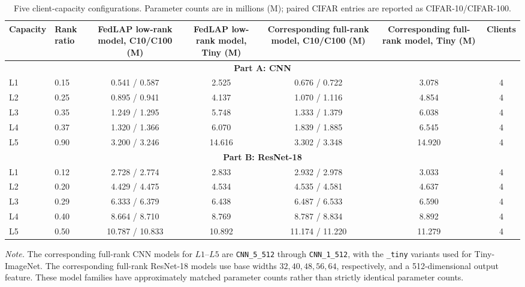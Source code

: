 \begin{table}[t]
\centering
\caption{Five client-capacity configurations.  Parameter counts are in
millions (M); paired CIFAR entries are reported as CIFAR-10/CIFAR-100.}
\label{tab:appendix_capacity_configurations}
\scriptsize
\setlength{\tabcolsep}{5pt}
\renewcommand{\arraystretch}{1.12}
\begin{tabularx}{\textwidth}{@{}llccccc@{}}
\toprule
\textbf{Capacity} & \textbf{Rank ratio} &
\textbf{FedLAP low-rank model, C10/C100 (M)} &
\textbf{FedLAP low-rank model, Tiny (M)} &
\textbf{Corresponding full-rank model, C10/C100 (M)} &
\textbf{Corresponding full-rank model, Tiny (M)} &
\textbf{Clients} \\
\midrule
\multicolumn{7}{c}{\textbf{Part A: CNN}} \\
\midrule
L1 & 0.15 & 0.541 / 0.587 & 2.525 & 0.676 / 0.722 & 3.078 & 4 \\
L2 & 0.25 & 0.895 / 0.941 & 4.137 & 1.070 / 1.116 & 4.854 & 4 \\
L3 & 0.35 & 1.249 / 1.295 & 5.748 & 1.333 / 1.379 & 6.038 & 4 \\
L4 & 0.37 & 1.320 / 1.366 & 6.070 & 1.839 / 1.885 & 6.545 & 4 \\
L5 & 0.90 & 3.200 / 3.246 & 14.616 & 3.302 / 3.348 & 14.920 & 4 \\
\midrule
\multicolumn{7}{c}{\textbf{Part B: ResNet-18}} \\
\midrule
L1 & 0.12 & 2.728 / 2.774 & 2.833 & 2.932 / 2.978 & 3.033 & 4 \\
L2 & 0.20 & 4.429 / 4.475 & 4.534 & 4.535 / 4.581 & 4.637 & 4 \\
L3 & 0.29 & 6.333 / 6.379 & 6.438 & 6.487 / 6.533 & 6.590 & 4 \\
L4 & 0.40 & 8.664 / 8.710 & 8.769 & 8.787 / 8.834 & 8.892 & 4 \\
L5 & 0.50 & 10.787 / 10.833 & 10.892 & 11.174 / 11.220 & 11.279 & 4 \\
\bottomrule
\end{tabularx}
\begin{minipage}{\textwidth}
\footnotesize
\textit{Note.} The corresponding full-rank CNN models for $L1$--$L5$ are
\texttt{CNN\_5\_512} through \texttt{CNN\_1\_512}, with the
\texttt{\_tiny} variants used for Tiny-ImageNet.  The corresponding full-rank
ResNet-18 models use base widths $32,40,48,56,64$, respectively, and a
512-dimensional output feature.  These model families have approximately
matched parameter counts rather than strictly identical parameter counts.
\end{minipage}
\end{table}

